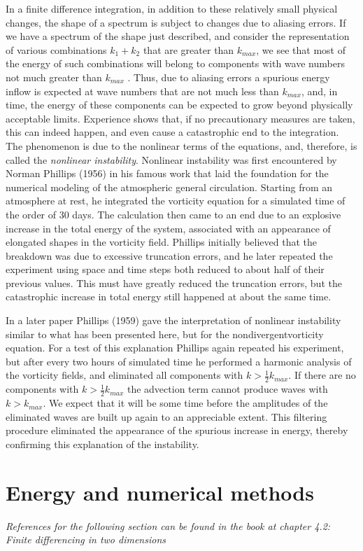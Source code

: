 In a finite difference integration, in addition to these relatively small physical changes, the shape of a spectrum is subject to changes due to aliasing errors. If we have a spectrum of the shape just described, and consider the representation of various combinations $k_1+k_2$ that are greater than $k_{max}$, we see that most of the energy of such combinations will belong to components with wave numbers not much greater than $k_{max}$ . Thus, due to aliasing errors a spurious energy inflow is expected at wave numbers that are not much less than $k_{max}$, and, in time, the energy of these components can be expected to grow beyond physically acceptable limits. Experience shows that, if no precautionary measures are taken, this can indeed happen, and even cause a catastrophic end to the integration. The phenomenon is due to the nonlinear terms of the equations, and, therefore, is called the \textit{nonlinear instability}. Nonlinear instability was first encountered by Norman Phillips (1956) in his famous work that laid the foundation for the numerical modeling of the atmospheric general circulation. Starting from an atmosphere at rest, he integrated the vorticity equation for a simulated time of the order of 30 days. The calculation then came to an end due to an explosive increase in the total energy of the system, associated with an appearance of elongated shapes in the vorticity field. Phillips initially believed that the breakdown was due to excessive truncation errors, and he later repeated the experiment using space and time steps both reduced to about half of their previous values. This must have greatly reduced the truncation errors, but the catastrophic increase in total energy still happened at about the same time.

In a later paper Phillips (1959) gave the interpretation of nonlinear instability similar to what has been presented here, but for the nondivergentvorticity equation. For a test of this explanation Phillips again repeated his experiment, but after every two hours of simulated time he performed a harmonic analysis of the vorticity fields, and eliminated all components with $k>\frac{1}{2}k_{max}$. If there are no components with $k>\frac{1}{2}k_{max}$ the advection term cannot produce waves with $k>k_{max}$. We expect that it will be some time before the amplitudes of the eliminated waves are built up again to an appreciable extent. This filtering procedure eliminated the appearance of the spurious increase in energy, thereby confirming this explanation of the instability.
\section{Energy and numerical methods}\label{sec:en and numerical methods}
\begin{center}
    \textit{References for the following section can be found in the book at chapter 4.2: Finite differencing in two dimensions}
\end{center}


